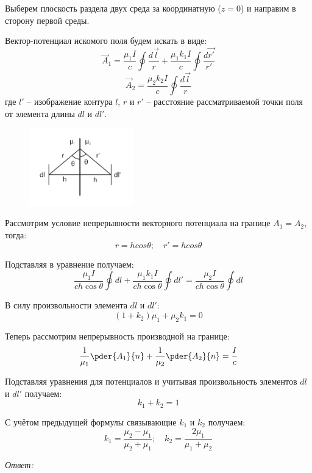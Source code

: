 Выберем плоскость раздела двух среда за координатную (\( z = 0 \)) и направим в 
сторону первой среды.

Вектор-потенциал искомого поля будем искать в виде:
\[
	\vec{A}_1 = \frac{\mu_1 I}{c} \oint \frac{d\vec{l}}{r} + 
		\frac{\mu_1 k_1 I}{c} \oint \frac{d\vec{r'}}{r'}
\]
\[
	\vec{A}_2 = \frac{\mu_2 k_2 I}{c} \oint \frac{d\vec{l}}{r}
\]
где \( l' \) -- изображение контура \( l \), \( r \) и \( r' \) -- 
расстояние рассматриваемой точки поля от элемента длины \( dl \) и \( dl' \).

\begin{figure}
	\vspace{-5ex}
	\includegraphics[width=0.4\textwidth]{pdf/image_2_35_2}
\end{figure}

Рассмотрим условие непрерывности векторного потенциала на границе 
\( A_1 = A_2 \), тогда:
\[
	r = hcos\theta;\quad r' = hcos\theta
\]

Подставляя в уравнение получаем:
\[
	\frac{\mu_1 I}{ch\cos\theta} \oint dl + 
	\frac{\mu_1 k_1 I}{ch\cos\theta} \oint dl' = 
	\frac{\mu_2 I}{ch\cos\theta} \oint dl
\]

В силу произвольности элемента \( dl \) и \( dl' \):
\[ 
	\left( 1 + k_2 \right) \mu_1 + \mu_2 k_1 = 0
\]

Теперь рассмотрим непрерывность производной на границе:
\[
	\frac{1}{\mu_1}\pder{A_1}{n} + \frac{1}{\mu_2}\pder{A_2}{n} = \frac{I}{c}
\]

\pagebreak

Подставляя уравнения для потенциалов и учитывая произвольность элементов 
\( dl \) и \( dl' \) получаем:
\[
	k_1 + k_2 = 1
\]

С учётом предыдущей формулы связывающие \( k_1 \) и \( k_2 \) получаем:
\[
	k_1 = \frac{\mu_2 - \mu_1}{\mu_2 + \mu_1};\quad
	k_2 = \frac{2\mu_1}{\mu_1 + \mu_2}
\]

\emph{Ответ:}
